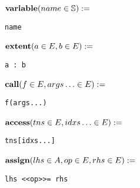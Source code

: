 \noindent\begin{minipage}{\leftwidth}
\raggedleft $\text{\textbf{variable}}(name \in \mathbb{S}) :=$~
\end{minipage}%
\begin{minipage}{\rightwidth}
\begin{verbatim}
name
\end{verbatim}
\end{minipage}

\noindent\begin{minipage}{\leftwidth}
\raggedleft $\text{\textbf{extent}}(a \in E, b \in E) :=$~
\end{minipage}%
\begin{minipage}{\rightwidth}
\begin{verbatim}
a : b
\end{verbatim}
\end{minipage}

\noindent\begin{minipage}{\leftwidth}
\raggedleft $\text{\textbf{call}}(f \in E, args\ldots \in E) :=$~
\end{minipage}%
\begin{minipage}{\rightwidth}
\begin{verbatim}
f(args...)
\end{verbatim}
\end{minipage}

\noindent\begin{minipage}{\leftwidth}
\raggedleft $\text{\textbf{access}}(tns \in E, idxs\ldots \in E) :=$~
\end{minipage}%
\begin{minipage}{\rightwidth}
\begin{verbatim}
tns[idxs...]
\end{verbatim}
\end{minipage}

\noindent\begin{minipage}{\leftwidth}
\raggedleft $\text{\textbf{assign}}(lhs \in A, op \in E, rhs \in E) :=$~
\end{minipage}%
\begin{minipage}{\rightwidth}
\begin{verbatim}
lhs <<op>>= rhs
\end{verbatim}
\end{minipage}

